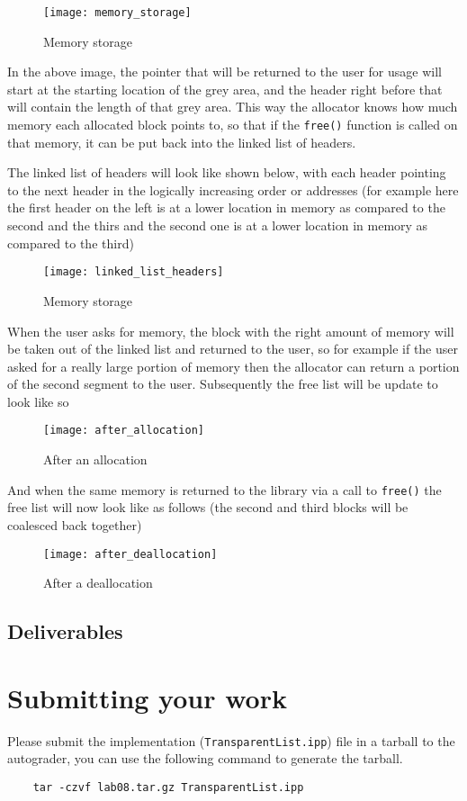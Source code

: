 \documentclass{article}
\begin{document}
\begin{figure}[!htb]
\centering
\texttt{[image: memory\_storage]}
\caption{Memory storage}
\end{figure}

In the above image, the pointer that will be returned to the user for usage
will start at the starting location of the grey area, and the header right
before that will contain the length of that grey area.  This way the allocator
knows how much memory each allocated block points to, so that if the
\texttt{free()} function is called on that memory, it can be put back into the
linked list of headers.

The linked list of headers will look like shown below, with each header
pointing to the next header in the logically increasing order or addresses
(for example here the first header on the left is at a lower location in
memory as compared to the second and the thirs and the second one is at a
lower location in memory as compared to the third)

\begin{figure}[!htb]
\centering
\texttt{[image: linked\_list\_headers]}
\caption{Memory storage}
\end{figure}

When the user asks for memory, the block with the right amount of memory will
be taken out of the linked list and returned to the user, so for example if
the user asked for a really large portion of memory then the allocator can
return a portion of the second segment to the user.  Subsequently the free
list will be update to look like so

\begin{figure}[!htb]
\centering
\texttt{[image: after\_allocation]}
\caption{After an allocation}
\end{figure}

And when the same memory is returned to the library via a call to
\texttt{free()} the free list will now look like as follows (the second and
third blocks will be coalesced back together)

\begin{figure}[!htb]
\centering
\texttt{[image: after\_deallocation]}
\caption{After a deallocation}
\end{figure}

\newpage
\subsection{Deliverables}

\newpage
\section{Submitting your work}
Please submit the implementation (\texttt{TransparentList.ipp}) file in a
tarball to the autograder, you can use the following command to generate the
tarball.
\begin{lstlisting}
    tar -czvf lab08.tar.gz TransparentList.ipp
\end{lstlisting}
\end{document}
